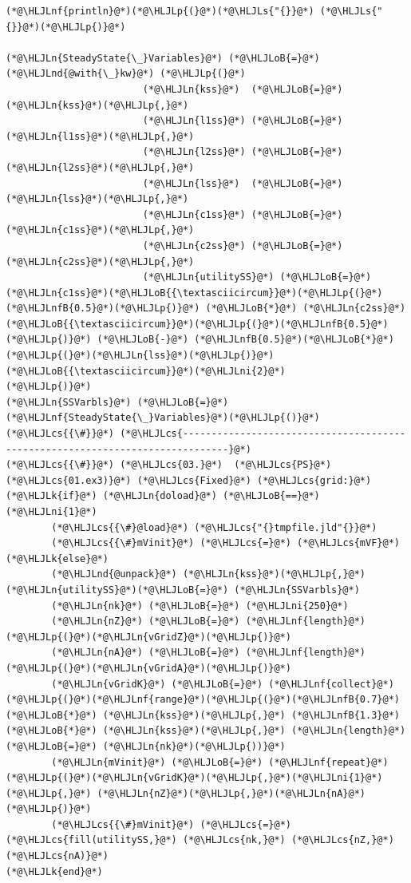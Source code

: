 \documentclass[12pt,a4paper]{article}
\newcommand{\HLJLk}[1]{\textcolor[RGB]{148,91,176}{\textbf{#1}}}
\newcommand{\HLJLn}[1]{#1}
\newcommand{\HLJLnd}[1]{\textcolor[RGB]{214,102,97}{#1}}
\newcommand{\HLJLnf}[1]{\textcolor[RGB]{66,102,213}{#1}}
\newcommand{\HLJLs}[1]{\textcolor[RGB]{201,61,57}{#1}}
\newcommand{\HLJLnfB}[1]{\textcolor[RGB]{59,151,46}{#1}}
\newcommand{\HLJLni}[1]{\textcolor[RGB]{59,151,46}{#1}}
\newcommand{\HLJLoB}[1]{\textcolor[RGB]{102,102,102}{\textbf{#1}}}
\newcommand{\HLJLp}[1]{#1}
\newcommand{\HLJLcs}[1]{\textcolor[RGB]{153,153,119}{\textit{#1}}}
\begin{document}
\begin{lstlisting}
(*@\HLJLnf{println}@*)(*@\HLJLp{(}@*)(*@\HLJLs{"{}}@*) (*@\HLJLs{"{}}@*)(*@\HLJLp{)}@*)

(*@\HLJLn{SteadyState{\_}Variables}@*) (*@\HLJLoB{=}@*) (*@\HLJLnd{@with{\_}kw}@*) (*@\HLJLp{(}@*)
                        (*@\HLJLn{kss}@*)  (*@\HLJLoB{=}@*) (*@\HLJLn{kss}@*)(*@\HLJLp{,}@*)
                        (*@\HLJLn{l1ss}@*) (*@\HLJLoB{=}@*)  (*@\HLJLn{l1ss}@*)(*@\HLJLp{,}@*)
                        (*@\HLJLn{l2ss}@*) (*@\HLJLoB{=}@*)  (*@\HLJLn{l2ss}@*)(*@\HLJLp{,}@*)
                        (*@\HLJLn{lss}@*)  (*@\HLJLoB{=}@*)  (*@\HLJLn{lss}@*)(*@\HLJLp{,}@*)
                        (*@\HLJLn{c1ss}@*) (*@\HLJLoB{=}@*)  (*@\HLJLn{c1ss}@*)(*@\HLJLp{,}@*)
                        (*@\HLJLn{c2ss}@*) (*@\HLJLoB{=}@*)  (*@\HLJLn{c2ss}@*)(*@\HLJLp{,}@*)
                        (*@\HLJLn{utilitySS}@*) (*@\HLJLoB{=}@*) (*@\HLJLn{c1ss}@*)(*@\HLJLoB{{\textasciicircum}}@*)(*@\HLJLp{(}@*)(*@\HLJLnfB{0.5}@*)(*@\HLJLp{)}@*) (*@\HLJLoB{*}@*) (*@\HLJLn{c2ss}@*)(*@\HLJLoB{{\textasciicircum}}@*)(*@\HLJLp{(}@*)(*@\HLJLnfB{0.5}@*)(*@\HLJLp{)}@*) (*@\HLJLoB{-}@*) (*@\HLJLnfB{0.5}@*)(*@\HLJLoB{*}@*)(*@\HLJLp{(}@*)(*@\HLJLn{lss}@*)(*@\HLJLp{)}@*)(*@\HLJLoB{{\textasciicircum}}@*)(*@\HLJLni{2}@*)
(*@\HLJLp{)}@*)
(*@\HLJLn{SSVarbls}@*) (*@\HLJLoB{=}@*) (*@\HLJLnf{SteadyState{\_}Variables}@*)(*@\HLJLp{()}@*)
(*@\HLJLcs{{\#}}@*) (*@\HLJLcs{------------------------------------------------------------------------------}@*)
(*@\HLJLcs{{\#}}@*) (*@\HLJLcs{03.}@*)  (*@\HLJLcs{PS}@*) (*@\HLJLcs{01.ex3)}@*) (*@\HLJLcs{Fixed}@*) (*@\HLJLcs{grid:}@*)
(*@\HLJLk{if}@*) (*@\HLJLn{doload}@*) (*@\HLJLoB{==}@*) (*@\HLJLni{1}@*)
        (*@\HLJLcs{{\#}@load}@*) (*@\HLJLcs{"{}tmpfile.jld"{}}@*)
        (*@\HLJLcs{{\#}mVinit}@*) (*@\HLJLcs{=}@*) (*@\HLJLcs{mVF}@*)
(*@\HLJLk{else}@*)
        (*@\HLJLnd{@unpack}@*) (*@\HLJLn{kss}@*)(*@\HLJLp{,}@*) (*@\HLJLn{utilitySS}@*)(*@\HLJLoB{=}@*) (*@\HLJLn{SSVarbls}@*)
        (*@\HLJLn{nk}@*) (*@\HLJLoB{=}@*) (*@\HLJLni{250}@*)
        (*@\HLJLn{nZ}@*) (*@\HLJLoB{=}@*) (*@\HLJLnf{length}@*)(*@\HLJLp{(}@*)(*@\HLJLn{vGridZ}@*)(*@\HLJLp{)}@*)
        (*@\HLJLn{nA}@*) (*@\HLJLoB{=}@*) (*@\HLJLnf{length}@*)(*@\HLJLp{(}@*)(*@\HLJLn{vGridA}@*)(*@\HLJLp{)}@*)
        (*@\HLJLn{vGridK}@*) (*@\HLJLoB{=}@*) (*@\HLJLnf{collect}@*)(*@\HLJLp{(}@*)(*@\HLJLnf{range}@*)(*@\HLJLp{(}@*)(*@\HLJLnfB{0.7}@*) (*@\HLJLoB{*}@*) (*@\HLJLn{kss}@*)(*@\HLJLp{,}@*) (*@\HLJLnfB{1.3}@*) (*@\HLJLoB{*}@*) (*@\HLJLn{kss}@*)(*@\HLJLp{,}@*) (*@\HLJLn{length}@*) (*@\HLJLoB{=}@*) (*@\HLJLn{nk}@*)(*@\HLJLp{))}@*)
        (*@\HLJLn{mVinit}@*) (*@\HLJLoB{=}@*) (*@\HLJLnf{repeat}@*)(*@\HLJLp{(}@*)(*@\HLJLn{vGridK}@*)(*@\HLJLp{,}@*)(*@\HLJLni{1}@*)(*@\HLJLp{,}@*) (*@\HLJLn{nZ}@*)(*@\HLJLp{,}@*)(*@\HLJLn{nA}@*)(*@\HLJLp{)}@*)
        (*@\HLJLcs{{\#}mVinit}@*) (*@\HLJLcs{=}@*) (*@\HLJLcs{fill(utilitySS,}@*) (*@\HLJLcs{nk,}@*) (*@\HLJLcs{nZ,}@*) (*@\HLJLcs{nA)}@*)
(*@\HLJLk{end}@*)


\end{lstlisting}
\end{document}
